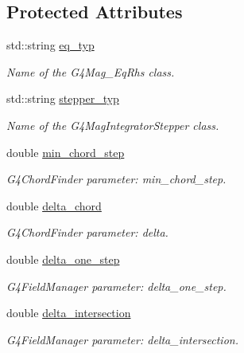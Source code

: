 \subsection*{Protected Attributes}
\begin{DoxyCompactItemize}
\item 
std\+::string \hyperlink{struct_d_d4hep_1_1_simulation_1_1_geant4_field_tracking_setup_aade0e19505a1c090a549c923b079ca56}{eq\+\_\+typ}
\begin{DoxyCompactList}\small\item\em Name of the G4\+Mag\+\_\+\+Eq\+Rhs class. \end{DoxyCompactList}\item 
std\+::string \hyperlink{struct_d_d4hep_1_1_simulation_1_1_geant4_field_tracking_setup_ab9e3cc336df0378ecdb3706c03347f9c}{stepper\+\_\+typ}
\begin{DoxyCompactList}\small\item\em Name of the G4\+Mag\+Integrator\+Stepper class. \end{DoxyCompactList}\item 
double \hyperlink{struct_d_d4hep_1_1_simulation_1_1_geant4_field_tracking_setup_a1ffabcaa88a6f30609794dc2f4c01d22}{min\+\_\+chord\+\_\+step}
\begin{DoxyCompactList}\small\item\em G4\+Chord\+Finder parameter\+: min\+\_\+chord\+\_\+step. \end{DoxyCompactList}\item 
double \hyperlink{struct_d_d4hep_1_1_simulation_1_1_geant4_field_tracking_setup_ac1e938991c5848a1a0cda7df729b5366}{delta\+\_\+chord}
\begin{DoxyCompactList}\small\item\em G4\+Chord\+Finder parameter\+: delta. \end{DoxyCompactList}\item 
double \hyperlink{struct_d_d4hep_1_1_simulation_1_1_geant4_field_tracking_setup_a7cc063c19cc28d0226234c6cb5e9b10e}{delta\+\_\+one\+\_\+step}
\begin{DoxyCompactList}\small\item\em G4\+Field\+Manager parameter\+: delta\+\_\+one\+\_\+step. \end{DoxyCompactList}\item 
double \hyperlink{struct_d_d4hep_1_1_simulation_1_1_geant4_field_tracking_setup_ad0e9178802e02034db7130dc778d1fc7}{delta\+\_\+intersection}
\begin{DoxyCompactList}\small\item\em G4\+Field\+Manager parameter\+: delta\+\_\+intersection. \end{DoxyCompactList}\item 

\end{DoxyCompactItemize}

